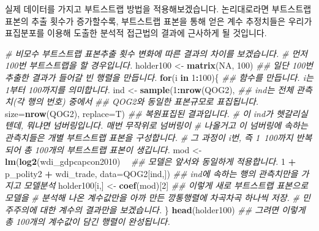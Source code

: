 \documentclass[
]{book}
\newenvironment{Shaded}{\begin{snugshade}}{\end{snugshade}}
\newcommand{\CommentTok}[1]{\textcolor[rgb]{0.56,0.35,0.01}{\textit{#1}}}
\newcommand{\ControlFlowTok}[1]{\textcolor[rgb]{0.13,0.29,0.53}{\textbf{#1}}}
\newcommand{\DataTypeTok}[1]{\textcolor[rgb]{0.13,0.29,0.53}{#1}}
\newcommand{\DecValTok}[1]{\textcolor[rgb]{0.00,0.00,0.81}{#1}}
\newcommand{\KeywordTok}[1]{\textcolor[rgb]{0.13,0.29,0.53}{\textbf{#1}}}
\newcommand{\NormalTok}[1]{#1}
\newcommand{\OperatorTok}[1]{\textcolor[rgb]{0.81,0.36,0.00}{\textbf{#1}}}
\newcommand{\OtherTok}[1]{\textcolor[rgb]{0.56,0.35,0.01}{#1}}
\newcommand{\StringTok}[1]{\textcolor[rgb]{0.31,0.60,0.02}{#1}}
\begin{document}
실제 데이터를 가지고 부트스트랩 방법을 적용해보겠습니다. 논리대로라면 부트스트랩 표본의 추출 횟수가 증가할수록, 부트스트랩 표본을 통해 얻은 계수 추정치들은 우리가 표집분포를 이용해 도출한 분석적 접근법의 결과에 근사하게 될 것입니다.

\begin{Shaded}
\begin{Highlighting}[]
\CommentTok{# 비모수 부트스트랩 표본추출 횟수 변화에 따른 결과의 차이를 보겠습니다.}
\CommentTok{# 먼저 100번 부트스트랩을 할 경우입니다.}
\NormalTok{holder100 <-}\StringTok{ }\KeywordTok{matrix}\NormalTok{(}\OtherTok{NA}\NormalTok{, }\DecValTok{100}\NormalTok{) }\CommentTok{## 일단 100번 추출한 결과가 들어갈 빈 행렬을 만듭니다.}
\ControlFlowTok{for}\NormalTok{(i }\ControlFlowTok{in} \DecValTok{1}\OperatorTok{:}\DecValTok{100}\NormalTok{)\{  }\CommentTok{## 함수를 만듭니다. i는 1부터 100까지를 의미합니다.}
\NormalTok{  ind <-}\StringTok{ }\KeywordTok{sample}\NormalTok{(}\DecValTok{1}\OperatorTok{:}\KeywordTok{nrow}\NormalTok{(QOG2), }\CommentTok{## ind는 전체 관측치(각 행의 번호) 중에서 }
              \CommentTok{## QOG2와 동일한 표본규모로 표집됩니다.}
                \DataTypeTok{size=}\KeywordTok{nrow}\NormalTok{(QOG2), }\DataTypeTok{replace=}\NormalTok{T) }\CommentTok{## 복원표집된 결과입니다.}
  \CommentTok{# 이 ind가 헷갈리실 텐데, 뭐냐면 넘버링입니다. 매번 무작위로 넘버링이 }
  \CommentTok{# 나올거고 이 넘버링에 속하는 관측치들은 개별 부트스트랩 표본을 구성합니다.}
  \CommentTok{# 그 과정이 i번, 즉 1~100까지 반복되어 총 100개의 부트스트랩 표본이 생깁니다.}
\NormalTok{  mod <-}\StringTok{ }\KeywordTok{lm}\NormalTok{(}\KeywordTok{log2}\NormalTok{(wdi_gdpcapcon2010) }\OperatorTok{~}\StringTok{ }\CommentTok{## 모델은 앞서와 동일하게 적용합니다.}
\StringTok{              }\DecValTok{1} \OperatorTok{+}\StringTok{  }\NormalTok{p_polity2 }\OperatorTok{+}\StringTok{ }\NormalTok{wdi_trade, }
            \DataTypeTok{data=}\NormalTok{QOG2[ind,]) }\CommentTok{## ind에 속하는 행의 관측치만을 가지고 모델분석}
\NormalTok{  holder100[i,] <-}\StringTok{ }\KeywordTok{coef}\NormalTok{(mod)[}\DecValTok{2}\NormalTok{] }\CommentTok{## 이렇게 새로 부트스트랩 표본으로 모델을 }
  \CommentTok{# 분석해 나온 계수값만을 아까 만든 깡통행렬에 차곡차곡 하나씩 저장.}
  \CommentTok{# 민주주의에 대한 계수의 결과만을 보겠습니다.}
\NormalTok{\}}
\KeywordTok{head}\NormalTok{(holder100) }\CommentTok{## 그려면 이렇게 총 100개의 계수값이 담긴 행렬이 완성됩니다.}
\end{Highlighting}
\end{Shaded}
\end{document}
